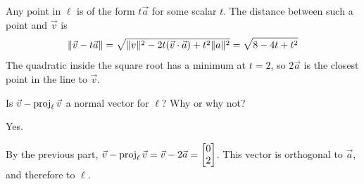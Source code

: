 \documentclass{workbook}
\begin{document}
\begin{slide}
\begin{parts}
\begin{solution}
				Any point in $\ell$ is of the form $t\vec a$ for some scalar
				$t$. The distance between such a point and $\vec v$ is
				\[
					\lVert\vec v - t\vec a\rVert
					=\sqrt{\lVert v\rVert^2 - 2t(\vec v\cdot \vec a) + t^2 \lVert a\rVert^2}
					=\sqrt{8 - 4t + t^2}
				\]
				The quadratic inside the square root has a minimum at
				$t = 2$, so $2 \vec a$ is the closest point in the line
				to $\vec v$.
			\end{solution}
		\item Is $\vec v-\operatorname{proj}_\ell \vec v$ a normal vector for $\ell$?
			Why or why not?
			\begin{solution}
				Yes.

				By the previous part, $\vec v-\Proj_\ell \vec v=\vec v-2\vec a=\mat{0\\2}$.
				This vector is orthogonal to $\vec a$, and therefore to $\ell$.
			\end{solution}
	\end{parts}
\end{slide}
\end{document}
